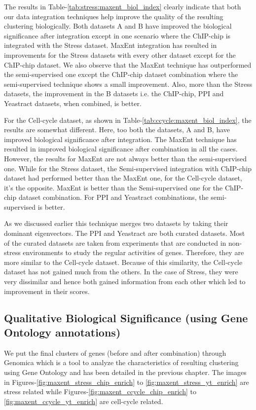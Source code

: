 The results in Table-\ref{tab:stress:maxent_biol_index} clearly indicate that both our data integration techniques 
help improve the quality of the resulting clustering biologically. Both datasets A and B have improved the 
biological significance after integration except in one scenario where the ChIP-chip is integrated with the Stress dataset. MaxEnt 
integration has resulted in improvements for the Stress datasets with every other dataset except for the 
ChIP-chip dataset. We also observe that the MaxEnt technique has outperformed 
the semi-supervised one except the ChIP-chip dataset combination where the semi-supervised technique shows a 
small improvement. Also, more than the Stress datasets, the improvement in the B datasets i.e. the ChIP-chip, PPI and Yeastract datasets, when combined, is better. 

For the Cell-cycle dataset, as shown in Table-\ref{tab:ccycle:maxent_biol_index}, the results are somewhat different. Here, too both the datasets, A and B, have improved biological 
significance after integration. The MaxEnt technique has resulted in improved biological significance
after combination in all the cases. However, the results for MaxEnt are not always better than the semi-supervised one. 
While for the Stress dataset,  the Semi-supervised integration with ChIP-chip dataset had performed 
better than the MaxEnt one, for the Cell-cycle dataset, it's the opposite. MaxEnt is better than the Semi-supervised one for the ChIP-chip dataset combination. 
For PPI and Yeastract combinations, the semi-supervised is better.
 
As we discussed earlier this technique merges two datasets by taking their dominant eigenvectors. The PPI and Yeastract 
are both curated datasets. Most of the curated datasets are taken from experiments that are conducted in non-stress environments to study the regular activities of genes. 
Therefore, they are more similar to the Cell-cycle dataset. Because of this similarity, the Cell-cycle dataset has not gained much from the others. 
In the case of Stress, they were very dissimilar and hence both gained information from each other which led to improvement in their scores.    

\subsection{Qualitative Biological Significance (using Gene Ontology annotations)} \label{maxent_biosig_go}

We put the final clusters of genes (before and after combination) through Genomica which is a tool to analyze the characteristics of resulting clustering using Gene Ontology and has been detailed in the previous chapter. The images in Figures-\ref{fig:maxent_stress_chip_enrich} to \ref{fig:maxent_stress_yt_enrich} are stress related while Figures-\ref{fig:maxent_ccycle_chip_enrich} to \ref{fig:maxent_ccycle_yt_enrich} are cell-cycle related.
 
